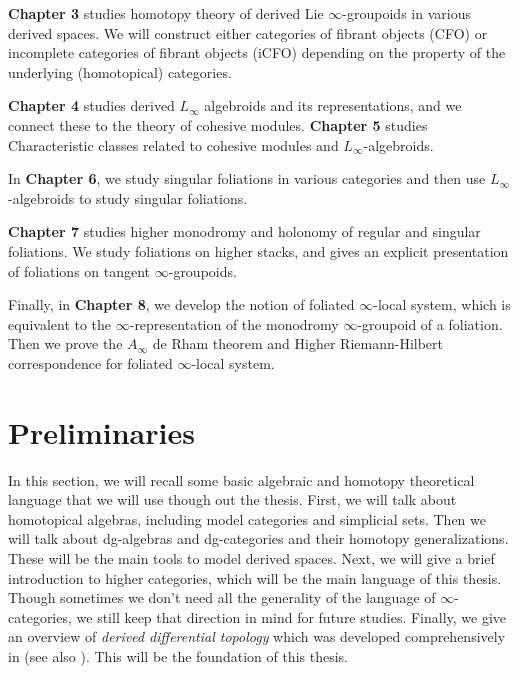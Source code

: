 \documentclass[12pt]{amsart}
\theoremstyle{definition}
\theoremstyle{remark}
\numberwithin{equation}{section}
\newcommand{\1}{{\mathbb{1}}}
\begin{document}
{\bf Chapter 3} studies homotopy theory of derived Lie $\infty$-groupoids in various derived spaces. We will construct either categories of fibrant objects (CFO) or incomplete categories of fibrant objects (iCFO) depending on the property of the underlying (homotopical) categories.

{\bf Chapter 4} studies derived $L_{\infty}$ algebroids and its representations, and we connect these to the theory of cohesive modules.  {\bf Chapter 5} studies Characteristic classes related to cohesive modules and $L_{\infty}$-algebroids.

In {\bf Chapter 6}, we study singular foliations in various categories and then use $L_{\infty}$-algebroids to study singular foliations. 

{\bf Chapter 7} studies higher monodromy and holonomy of regular and singular foliations. We study foliations on higher stacks, and gives an explicit presentation of foliations on tangent $\infty$-groupoids.

Finally, in {\bf Chapter 8}, we develop the notion of foliated $\infty$-local system, which is equivalent to the $\infty$-representation of the monodromy $\infty$-groupoid of a foliation. Then we prove the $A_{\infty}$ de Rham theorem and Higher Riemann-Hilbert correspondence for  foliated $\infty$-local system. 












\part{Preliminaries}
In this section, we will recall some basic algebraic and homotopy theoretical language that we will use though out the thesis. First, we will talk about homotopical algebras, including model categories and simplicial sets. Then we will talk about dg-algebras and dg-categories and their homotopy generalizations. These will be the main tools to model derived spaces. Next, we will give a brief introduction to higher categories, which will be the main language of this thesis. Though sometimes we don't need all the generality of the language of $\infty$-categories, we still keep that direction in mind for future studies. Finally, we give an overview of {\it derived differential topology} which was developed comprehensively in \cite{Nui18} (see also \cite{Spi08}\cite{Lur09a}\cite{Pri20a}). This will be the foundation of this thesis.
\end{document}
